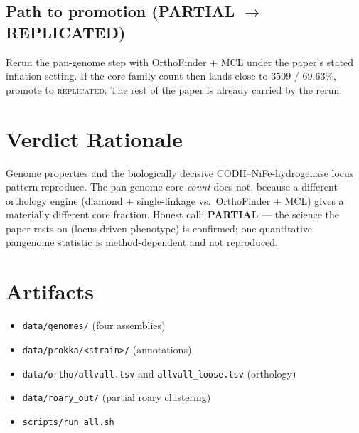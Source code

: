 \documentclass[11pt]{article}
\begin{document}
\subsection*{Path to promotion (PARTIAL $\to$ REPLICATED)}
Rerun the pan-genome step with OrthoFinder + MCL under the paper's stated
inflation setting. If the core-family count then lands close to 3509 / 69.63\%,
promote to \textsc{replicated}. The rest of the paper is already carried by
the rerun.

\section{Verdict Rationale}
Genome properties and the biologically decisive CODH--NiFe-hydrogenase
locus pattern reproduce. The pan-genome core \emph{count} does not, because
a different orthology engine (diamond + single-linkage vs.\ OrthoFinder + MCL)
gives a materially different core fraction. Honest call: \textbf{PARTIAL}
--- the science the paper rests on (locus-driven phenotype) is confirmed;
one quantitative pangenome statistic is method-dependent and not reproduced.

\section*{Artifacts}
\begin{itemize}
  \item \texttt{data/genomes/} (four assemblies)
  \item \texttt{data/prokka/<strain>/} (annotations)
  \item \texttt{data/ortho/allvall.tsv} and \texttt{allvall\_loose.tsv} (orthology)
  \item \texttt{data/roary\_out/} (partial roary clustering)
  \item \texttt{scripts/run\_all.sh}
\end{itemize}
\end{document}
